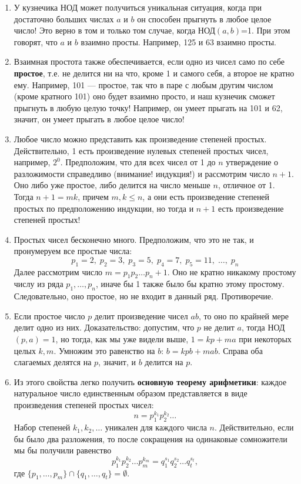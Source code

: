 \begin{enumerate}
\item У кузнечика НОД может получиться уникальная ситуация, когда при достаточно больших числах $a$ и $b$ он способен прыгнуть в любое целое число! Это верно в том и только том случае, когда НОД$(a,b)$=1. При этом говорят, что $a$ и $b$ взаимно просты. Например, 125 и 63 взаимно просты.
\item Взаимная простота также обеспечивается, если одно из чисел само по себе \textbf{простое}, т.е. не делится ни на что, кроме 1 и самого себя, а второе не кратно ему. Например, 101 --- простое, так что в паре с любым другим числом (кроме кратного 101) оно будет взаимно просто, и наш кузнечик сможет прыгнуть в любую целую точку! Например, он умеет прыгать на 101 и 62, значит, он умеет прыгать в любое целое число!
\item Любое число можно представить как произведение степеней простых. Действительно, 1 есть произведение нулевых степеней простых чисел, например, $2^0$. Предположим, что для всех чисел от 1 до $n$ утверждение о разложимости справедливо (внимание! индукция!) и рассмотрим число $n+1$. Оно либо уже простое, либо делится на число меньше $n$, отличное от 1. Тогда $n+1=mk$, причем $m,k\le n$, а они есть произведение степеней простых по предположению индукции, но тогда и $n+1$ есть произведение степеней простых!
\item Простых чисел бесконечно много. Предположим, что это не так, и пронумеруем все простые числа:
$$
p_1=2,\;p_2=3,\;p_3=5,\;p_4=7,\;p_5=11,\;\dots,\;p_n
$$
Далее рассмотрим число $m=p_1p_2\dots p_n+1$. Оно не кратно никакому простому числу из ряда $p_1,\dots,p_n$, иначе бы 1 также было бы кратно этому простому. Следовательно, оно простое, но не входит в данный ряд. Противоречие.
\item Если простое число $p$ делит произведение чисел $ab$, то оно по крайней мере делит одно из них. Доказательство: допустим, что $p$ не делит $a$, тогда НОД$(p,a)=1$, но тогда, как мы уже видели выше, $1=kp+ma$ при некоторых целых $k,m$. Умножим это равенство на $b$: $b=kpb+mab$. Справа оба слагаемых делятся на $p$, значит, и $b$ делится на $p$.
\item Из этого свойства легко получить \textbf{основную теорему арифметики}: каждое натуральное число единственным образом представляется в виде произведения степеней простых чисел:
$$
n=p_1^{k_1}p_2^{k_2}\dots
$$
Набор степеней $k_1,k_2,\dots$ уникален для каждого числа $n$. Действительно, если бы было два разложения, то после сокращения на одинаковые сомножители мы бы получили равенство
$$
p_1^{k_1}p_2^{k_2}\dots p_m^{k_m} = q_1^{s_1}q_2^{s_2}\dots q_t^{s_t},
$$
где $\{p_1,\dots,p_m\}\cap\{q_1,\dots,q_t\}=\emptyset$.


\end{enumerate}

